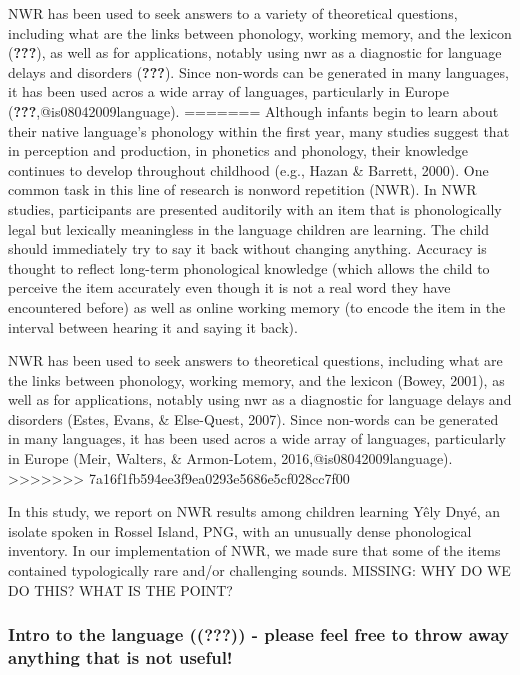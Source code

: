 \documentclass[english,,man,floatsintext]{apa6}
\begin{document}
NWR has been used to seek answers to a variety of theoretical questions, including what are the links between phonology, working memory, and the lexicon ({\textbf{???}}), as well as for applications, notably using nwr as a diagnostic for language delays and disorders ({\textbf{???}}). Since non-words can be generated in many languages, it has been used acros a wide array of languages, particularly in Europe ({\textbf{???}},@is08042009language).
=======
Although infants begin to learn about their native language's phonology within the first year, many studies suggest that in perception and production, in phonetics and phonology, their knowledge continues to develop throughout childhood (e.g., Hazan \& Barrett, 2000). One common task in this line of research is nonword repetition (NWR). In NWR studies, participants are presented auditorily with an item that is phonologically legal but lexically meaningless in the language children are learning. The child should immediately try to say it back without changing anything. Accuracy is thought to reflect long-term phonological knowledge (which allows the child to perceive the item accurately even though it is not a real word they have encountered before) as well as online working memory (to encode the item in the interval between hearing it and saying it back).

NWR has been used to seek answers to theoretical questions, including what are the links between phonology, working memory, and the lexicon (Bowey, 2001), as well as for applications, notably using nwr as a diagnostic for language delays and disorders (Estes, Evans, \& Else-Quest, 2007). Since non-words can be generated in many languages, it has been used acros a wide array of languages, particularly in Europe (Meir, Walters, \& Armon-Lotem, 2016,@is08042009language).
>>>>>>> 7a16f1fb594ee3f9ea0293e5686e5cf028cc7f00

In this study, we report on NWR results among children learning Yêly Dnyé, an isolate spoken in Rossel Island, PNG, with an unusually dense phonological inventory. In our implementation of NWR, we made sure that some of the items contained typologically rare and/or challenging sounds. MISSING: WHY DO WE DO THIS? WHAT IS THE POINT?

\hypertarget{intro-to-the-language-mc---please-feel-free-to-throw-away-anything-that-is-not-useful}{%
\subsubsection{\texorpdfstring{Intro to the language (({\textbf{???}})) - please feel free to throw away anything that is not useful!}{Intro to the language ((???)) - please feel free to throw away anything that is not useful!}}\label{intro-to-the-language-mc---please-feel-free-to-throw-away-anything-that-is-not-useful}}
\end{document}
